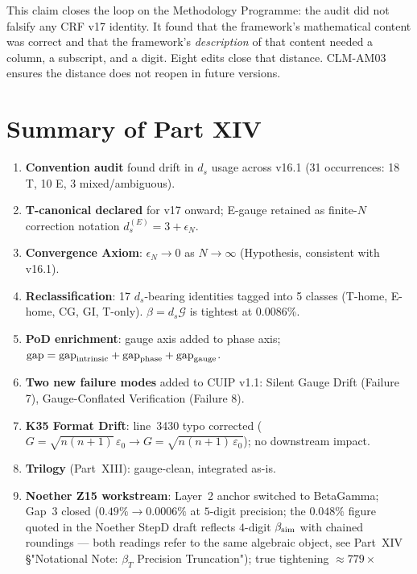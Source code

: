 \documentclass[12pt, a4paper]{article}
\begin{document}
This claim closes the loop on the Methodology Programme: the audit did
not falsify any CRF v17 identity. It found that the framework's
mathematical content was correct and that the framework's
\emph{description} of that content needed a column, a subscript, and
a digit. Eight edits close that distance. CLM-AM03 ensures the
distance does not reopen in future versions.

\section{Summary of Part XIV}

\begin{enumerate}[leftmargin=*]
\item \textbf{Convention audit} found drift in $d_s$ usage across v16.1
  (31 occurrences: 18 T, 10 E, 3 mixed/ambiguous).
\item \textbf{T-canonical declared} for v17 onward; E-gauge retained as
  finite-$N$ correction notation $d_s^{(E)} = 3 + \epsilon_N$.
\item \textbf{Convergence Axiom}: $\epsilon_N \to 0$ as $N\to\infty$ (Hypothesis,
  consistent with v16.1).
\item \textbf{Reclassification}: 17 $d_s$-bearing identities tagged into 5 classes
  (T-home, E-home, CG, GI, T-only). $\beta = d_s\mathcal{G}$ is tightest at 0.0086\%.
\item \textbf{PoD enrichment}: gauge axis added to phase axis;
  $\text{gap} = \text{gap}_{\rm intrinsic} + \text{gap}_{\rm phase} + \text{gap}_{\rm gauge}$.
\item \textbf{Two new failure modes} added to CUIP v1.1:
  Silent Gauge Drift (Failure 7), Gauge-Conflated Verification (Failure 8).
\item \textbf{K35 Format Drift}: line~3430 typo corrected
  ($G = \sqrt{n(n+1)}\,\varepsilon_0 \to G = \sqrt{n(n+1)\,\varepsilon_0}$);
  no downstream impact.
\item \textbf{Trilogy} (Part~XIII): gauge-clean, integrated as-is.
\item \textbf{Noether Z15 workstream}: Layer~2 anchor switched to BetaGamma;
  Gap~3 closed ($0.49\% \to 0.0006\%$ at $5$-digit precision; the
  $0.048\%$ figure quoted in the Noether StepD draft reflects $4$-digit
  $\beta_{\rm sim}$ with chained roundings --- both readings refer to
  the same algebraic object, see Part~XIV §"Notational Note: $\beta_T$
  Precision Truncation"); true tightening $\approx 779\times$

\end{enumerate}
\end{document}
